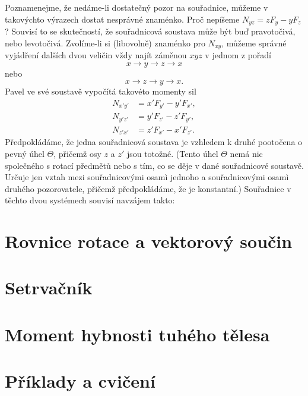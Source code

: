     Poznamenejme, že nedáme-li dostatečný pozor na souřadnice, můžeme v takovýchto výrazech dostat
    nesprávné znaménko. Proč nepíšeme \(N_{yz} = zF_y - yF_z\)? Souvisí to se skutečností, že
    souřadnicová soustava může být buď pravotočivá, nebo levotočivá. Zvolíme-li si (libovolně)
    znaménko pro \(N_{xy}\), můžeme správné vyjádření dalších dvou veličin vždy najít záměnou
    \(xyz\) v jednom z pořadí
    \begin{equation*}
      x \rightarrow y \rightarrow z \rightarrow x
    \end{equation*}
    nebo
    \begin{equation*}
      x \rightarrow z \rightarrow y \rightarrow x.
    \end{equation*}
    Pavel ve své soustavě vypočítá takovéto momenty sil
    \begin{subequations}\label{fyz:eq711}
      \begin{align}
        N_{x'y'} &=  x'F_{y'} - y'F_{x'}, \label{fyz:eq711a}  \\
        N_{y'z'} &=  y'F_{z'} - z'F_{y'}, \label{fyz:eq711b}  \\
        N_{z'x'} &=  z'F_{x'} - x'F_{z'}. \label{fyz:eq711c}        
      \end{align}
    \end{subequations} 
    Předpokládáme, že jedna souřadnicová soustava je vzhledem k druhé pootočena o pevný úhel
    \(\Theta\), přičemž osy \(z\) a \(z'\) jsou totožné. (Tento úhel \(\Theta\) nemá nic společného
    s rotací předmětů nebo s tím, co se děje v dané souřadnicové soustavě. Určuje jen vztah mezi
    souřadnicovými osamì jednoho a souřadnicovými osamì druhého pozorovatele, přičemž předpokládáme,
    že je konstantní.) Souřadnice v těchto dvou systémech souvisí navzájem takto:

  \section{Rovnice rotace a vektorový součin}\label{fyz:IchapXXsecII}
  \section{Setrvačník}\label{fyz:IchapXXsecIII}
  \section{Moment hybnosti tuhého tělesa}\label{fyz:IchapXXsecIV}
  \section{Příklady a cvičení}\label{fyz:IchapXXsecV}  

